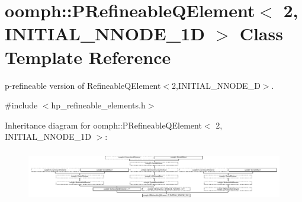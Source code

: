 \hypertarget{classoomph_1_1PRefineableQElement_3_012_00_01INITIAL__NNODE__1D_01_4}{}\section{oomph\+:\+:P\+Refineable\+Q\+Element$<$ 2, I\+N\+I\+T\+I\+A\+L\+\_\+\+N\+N\+O\+D\+E\+\_\+1D $>$ Class Template Reference}
\label{classoomph_1_1PRefineableQElement_3_012_00_01INITIAL__NNODE__1D_01_4}


p-\/refineable version of Refineable\+Q\+Element$<$2,\+I\+N\+I\+T\+I\+A\+L\+\_\+\+N\+N\+O\+D\+E\+\_\+D$>$.  




{\ttfamily \#include $<$hp\+\_\+refineable\+\_\+elements.\+h$>$}

Inheritance diagram for oomph\+:\+:P\+Refineable\+Q\+Element$<$ 2, I\+N\+I\+T\+I\+A\+L\+\_\+\+N\+N\+O\+D\+E\+\_\+1D $>$\+:\begin{figure}[H]
\begin{center}
\leavevmode
\includegraphics[height=2.299120cm]{classoomph_1_1PRefineableQElement_3_012_00_01INITIAL__NNODE__1D_01_4}
\end{center}
\end{figure}
